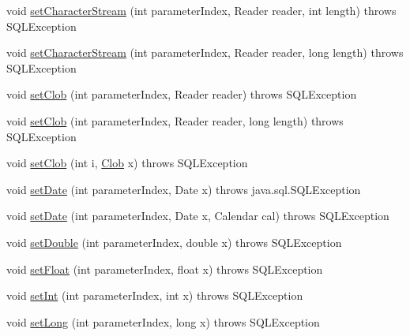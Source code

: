 \begin{DoxyCompactItemize}
\item 
void \mbox{\hyperlink{classcom_1_1mysql_1_1cj_1_1jdbc_1_1_client_prepared_statement_a0eee1d087bfd59e43eab2044bdef9399}{set\+Character\+Stream}} (int parameter\+Index, Reader reader, int length)  throws S\+Q\+L\+Exception 
\item 
void \mbox{\hyperlink{classcom_1_1mysql_1_1cj_1_1jdbc_1_1_client_prepared_statement_a551fab80872ae237650491dde1dc4aa5}{set\+Character\+Stream}} (int parameter\+Index, Reader reader, long length)  throws S\+Q\+L\+Exception 
\item 
void \mbox{\hyperlink{classcom_1_1mysql_1_1cj_1_1jdbc_1_1_client_prepared_statement_aba19a5a54ecc0a558f2d48e64386086f}{set\+Clob}} (int parameter\+Index, Reader reader)  throws S\+Q\+L\+Exception 
\item 
void \mbox{\hyperlink{classcom_1_1mysql_1_1cj_1_1jdbc_1_1_client_prepared_statement_a014adbee9d39d688a45b39ccb61f8707}{set\+Clob}} (int parameter\+Index, Reader reader, long length)  throws S\+Q\+L\+Exception 
\item 
void \mbox{\hyperlink{classcom_1_1mysql_1_1cj_1_1jdbc_1_1_client_prepared_statement_a15fa1b4e785622309c79db55fe2ee366}{set\+Clob}} (int i, \mbox{\hyperlink{classcom_1_1mysql_1_1cj_1_1jdbc_1_1_clob}{Clob}} x)  throws S\+Q\+L\+Exception 
\item 
void \mbox{\hyperlink{classcom_1_1mysql_1_1cj_1_1jdbc_1_1_client_prepared_statement_a9862dd483e0e6b40a661ca9e103cf554}{set\+Date}} (int parameter\+Index, Date x)  throws java.\+sql.\+S\+Q\+L\+Exception 
\item 
void \mbox{\hyperlink{classcom_1_1mysql_1_1cj_1_1jdbc_1_1_client_prepared_statement_af08c1ce048baaa4cfa839b1f83e86c88}{set\+Date}} (int parameter\+Index, Date x, Calendar cal)  throws S\+Q\+L\+Exception 
\item 
void \mbox{\hyperlink{classcom_1_1mysql_1_1cj_1_1jdbc_1_1_client_prepared_statement_a249c9b7397b246ff0580d1f5033e10c7}{set\+Double}} (int parameter\+Index, double x)  throws S\+Q\+L\+Exception 
\item 
void \mbox{\hyperlink{classcom_1_1mysql_1_1cj_1_1jdbc_1_1_client_prepared_statement_acd30db03a3ceb7aac1c8d53f4878084b}{set\+Float}} (int parameter\+Index, float x)  throws S\+Q\+L\+Exception 
\item 
void \mbox{\hyperlink{classcom_1_1mysql_1_1cj_1_1jdbc_1_1_client_prepared_statement_a948985a2b43064dcd87dd1e7eb96d545}{set\+Int}} (int parameter\+Index, int x)  throws S\+Q\+L\+Exception 
\item 
void \mbox{\hyperlink{classcom_1_1mysql_1_1cj_1_1jdbc_1_1_client_prepared_statement_a33090f6c01fe815f37ff611b2ebb4961}{set\+Long}} (int parameter\+Index, long x)  throws S\+Q\+L\+Exception 

\end{DoxyCompactItemize}
